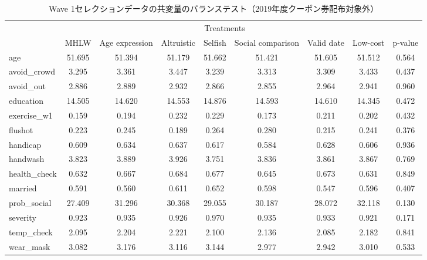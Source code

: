 \documentclass[
  11pt,
  a4paper,
]{article}
\begin{document}
\begin{table}

\caption{\label{tab:show-act-coupon0-balance}Wave 1セレクションデータの共変量のバランステスト（2019年度クーポン券配布対象外）}
\centering
\begin{tabular}[t]{lcccccccc}
\toprule
\multicolumn{1}{c}{ } & \multicolumn{7}{c}{Treatments} & \multicolumn{1}{c}{ } \\
\cmidrule(l{3pt}r{3pt}){2-8}
  & MHLW & Age expression & Altruistic & Selfish & Social comparison & Valid date & Low-cost & p-value\\
\midrule
age & 51.695 & 51.394 & 51.179 & 51.662 & 51.421 & 51.605 & 51.512 & 0.564\\
avoid\_crowd & 3.295 & 3.361 & 3.447 & 3.239 & 3.313 & 3.309 & 3.433 & 0.437\\
avoid\_out & 2.886 & 2.889 & 2.932 & 2.866 & 2.855 & 2.964 & 2.941 & 0.960\\
education & 14.505 & 14.620 & 14.553 & 14.876 & 14.593 & 14.610 & 14.345 & 0.472\\
exercise\_w1 & 0.159 & 0.194 & 0.232 & 0.229 & 0.173 & 0.211 & 0.202 & 0.432\\
flushot & 0.223 & 0.245 & 0.189 & 0.264 & 0.280 & 0.215 & 0.241 & 0.376\\
handicap & 0.609 & 0.634 & 0.637 & 0.617 & 0.584 & 0.628 & 0.606 & 0.936\\
handwash & 3.823 & 3.889 & 3.926 & 3.751 & 3.836 & 3.861 & 3.867 & 0.769\\
health\_check & 0.632 & 0.667 & 0.684 & 0.677 & 0.645 & 0.673 & 0.631 & 0.849\\
married & 0.591 & 0.560 & 0.611 & 0.652 & 0.598 & 0.547 & 0.596 & 0.407\\
prob\_social & 27.409 & 31.296 & 30.368 & 29.055 & 30.187 & 28.072 & 32.118 & 0.130\\
severity & 0.923 & 0.935 & 0.926 & 0.970 & 0.935 & 0.933 & 0.921 & 0.171\\
temp\_check & 2.095 & 2.204 & 2.221 & 2.100 & 2.136 & 2.085 & 2.182 & 0.841\\
wear\_mask & 3.082 & 3.176 & 3.116 & 3.144 & 2.977 & 2.942 & 3.010 & 0.533\\
\bottomrule
\end{tabular}
\end{table}
\end{document}

